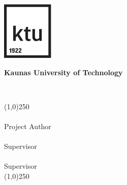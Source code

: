 
\begin{titlepage}
   \begin{center}
   	 

        \vspace*{0.3cm}
        \includegraphics[width=2.46cm]{images/ktu-ikona.pdf}
        \vspace{0.3cm}
		
       \textbf{Kaunas University of Technology}
       \\ \projectFaculty
       
       \bigskip
       \vspace{2cm}
       
       \LARGE
        \textbf{\expandafter\capitalisewords\expandafter{\projectTitle}} \\
        \large
        	\projectType
       
%

       \vspace{1cm}
       {\color{lines_name} \line(1,0){250} \\}
       \vspace{1cm}
       \normalsize\textbf{\projectAuthorName} \\
       Project Author
       \vspace{1cm} \\
       \normalsize\textbf{\projectSupervisorNameFirst} \\
       Supervisor
       \vspace{1cm} \\
       \normalsize\textbf{\projectSupervisorNameSecond} \\
       Supervisor %
       \vspace{1cm} \\       
       {\color{lines_name} \line(1,0){250} \\}


\end{center}
\end{titlepage}
